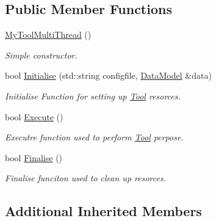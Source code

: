 \subsection*{Public Member Functions}
\begin{DoxyCompactItemize}
\item 
\hypertarget{classMyToolMultiThread_ac24f005c6da9c552871f6ff2672cf7f1}{\hyperlink{classMyToolMultiThread_ac24f005c6da9c552871f6ff2672cf7f1}{My\-Tool\-Multi\-Thread} ()}\label{classMyToolMultiThread_ac24f005c6da9c552871f6ff2672cf7f1}

\begin{DoxyCompactList}\small\item\em Simple constructor. \end{DoxyCompactList}\item 
bool \hyperlink{classMyToolMultiThread_a19dc55079a7b2da02ad9addd565b8e80}{Initialise} (std\-::string configfile, \hyperlink{classDataModel}{Data\-Model} \&data)
\begin{DoxyCompactList}\small\item\em Initialise Function for setting up \hyperlink{classTool}{Tool} resorces. \end{DoxyCompactList}\item 
\hypertarget{classMyToolMultiThread_a9cd7c894fc4797b2d81e12e25eb5beec}{bool \hyperlink{classMyToolMultiThread_a9cd7c894fc4797b2d81e12e25eb5beec}{Execute} ()}\label{classMyToolMultiThread_a9cd7c894fc4797b2d81e12e25eb5beec}

\begin{DoxyCompactList}\small\item\em Executre function used to perform \hyperlink{classTool}{Tool} perpose. \end{DoxyCompactList}\item 
\hypertarget{classMyToolMultiThread_a8f25561dc6a5daf8f4db85afecbb2c38}{bool \hyperlink{classMyToolMultiThread_a8f25561dc6a5daf8f4db85afecbb2c38}{Finalise} ()}\label{classMyToolMultiThread_a8f25561dc6a5daf8f4db85afecbb2c38}

\begin{DoxyCompactList}\small\item\em Finalise funciton used to clean up resorces. \end{DoxyCompactList}\end{DoxyCompactItemize}
\subsection*{Additional Inherited Members}


